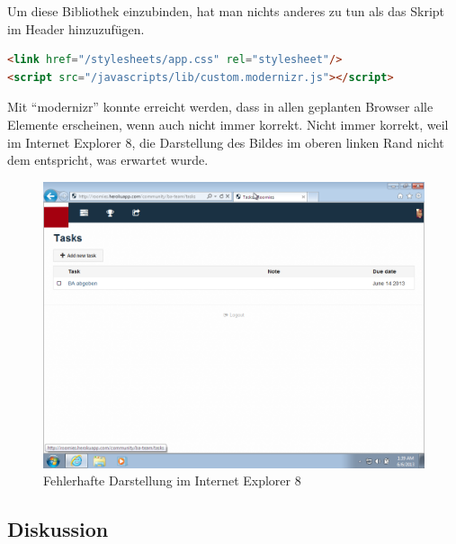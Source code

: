Um diese Bibliothek einzubinden, hat man nichts anderes zu tun als das Skript im Header hinzuzufügen.

\begin{lstlisting}[language=HTML, caption=Einbinden von modernizr \cite{roomiesLayout}, firstnumber=11, label=lst:mdernizrLayoutServer]
<link href="/stylesheets/app.css" rel="stylesheet"/>
<script src="/javascripts/lib/custom.modernizr.js"></script>
\end{lstlisting}

Mit ``modernizr'' konnte erreicht werden, dass in allen geplanten Browser alle Elemente erscheinen, wenn auch nicht immer korrekt. Nicht immer korrekt, weil im Internet Explorer 8, die Darstellung des Bildes im oberen linken Rand nicht dem entspricht, was erwartet wurde.

\begin{figure}[H]
	\centering
	\includegraphics[width=12cm]{content/principle-demonstration/images/progressive-enhancement-ie8.png}
	\caption{Fehlerhafte Darstellung im Internet Explorer 8}
	\label{fig:iossafari-datepicker}
\end{figure}

\subsection*{Diskussion}

